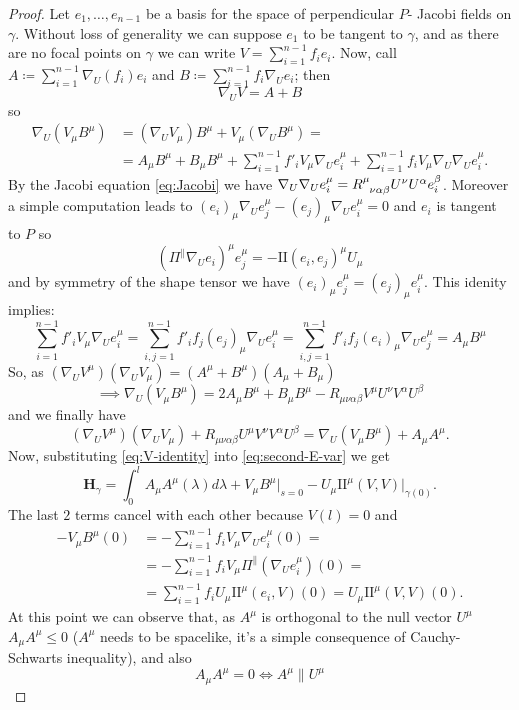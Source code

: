 \begin{proof}
	Let \(e_1, \ldots, e_{n - 1}\) be a basis for the space of perpendicular \(P\)- Jacobi fields on \(\gamma\). Without loss of generality we can suppose \(e_1\) to be tangent to \(\gamma\), and as there are no focal points on \(\gamma\) we can write \(V = \sum_{i = 1}^{n - 1} f_ie_i\).
	Now, call \(A \coloneqq \sum_{i = 1}^{n - 1} \nabla_U(f_i)e_i\) and \(B \coloneqq \sum_{i = 1}^{n - 1} f_i\nabla_Ue_i\); then
	\[
	\nabla_UV = A + B
	\]
	so
	\begin{align*}
		\nabla_U(V_{\mu}B^{\mu}) &= (\nabla_UV_{\mu})B^{\mu} + V_{\mu}(\nabla_UB^{\mu}) = \\
		 &= A_{\mu}B^{\mu} + B_{\mu}B^{\mu} + \sum_{i = 1}^{n - 1}f'_iV_{\mu}\nabla_Ue_i^{\mu} + \sum_{i = 1}^{n - 1}f_iV_{\mu}\nabla_U\nabla_Ue_i^{\mu}.
	\end{align*}
	By the Jacobi equation \eqref{eq:Jacobi} we have \(\nabla_U\nabla_Ue_i^{\mu} = R\indices{^{\mu}_{\nu\alpha\beta}}U^{\nu}U^{\alpha}e_i^{\beta}\). Moreover a simple computation leads to \((e_i)_{\mu}\nabla_Ue_j^{\mu} - (e_j)_{\mu}\nabla_Ue_i^{\mu} = 0\) and \(e_i\) is tangent to \(P\) so
	\[
	(\Pi^{\parallel}\nabla_Ue_i)^{\mu}e_j^{\mu} = - \mathrm{I\!I}(e_i, e_j)^{\mu}U_{\mu}
	\]
	and by symmetry of the shape tensor we have \((e_i)_{\mu}e_j^{\mu} = (e_j)_{\mu}e_i^{\mu}\). This idenity implies:
	\[
	\sum_{i = 1}^{n - 1}f'_iV_{\mu}\nabla_Ue_i^{\mu} = \sum_{i, j = 1}^{n - 1}f'_if_j(e_j)_{\mu}\nabla_Ue_i^{\mu} = \sum_{i, j = 1}^{n - 1}f'_if_j(e_i)_{\mu}\nabla_Ue_j^{\mu} = A_{\mu}B^{\mu}
	\]
	So, as \((\nabla_UV^{\mu})(\nabla_UV_{\mu}) = (A^{\mu} + B^{\mu}) (A_{\mu} + B_{\mu})\)
	\[
	\implies \nabla_U(V_{\mu}B^{\mu}) = 2A_{\mu}B^{\mu} + B_{\mu}B^{\mu} - R_{\mu\nu\alpha\beta}V^{\mu}U^{\nu}V^{\alpha}U^{\beta}
	\]
	and we finally have
	\begin{equation}
	\label{eq:V-identity}
		(\nabla_UV^{\mu})(\nabla_UV_{\mu}) + R_{\mu\nu\alpha\beta}U^{\mu}V^{\nu}V^{\alpha}U^{\beta} =  \nabla_U(V_{\mu}B^{\mu})  + A_{\mu}A^{\mu}.
	\end{equation}
	Now, substituting \eqref{eq:V-identity} into \eqref{eq:second-E-var} we get
	\[
	\textbf{H}_{\gamma} = \int_{0}^{l} A_{\mu}A^{\mu}(\lambda) d\lambda + V_{\mu}B^{\mu}\Big\vert_{s = 0} - U_{\mu}\mathrm{I\!I}^{\mu}(V, V)\vert_{\gamma(0)}.
	\]
	The last \(2\) terms cancel with each other because \(V(l) = 0\) and 
	\begin{align*}
		-V_{\mu}B^{\mu}(0) &= - \sum_{i = 1}^{n - 1}f_i V_{\mu}\nabla_Ue_i^{\mu}(0) =\\
		& = - \sum_{i = 1}^{n - 1}f_i V_{\mu}\Pi^{\parallel}\left(\nabla_Ue_i^{\mu}\right)(0) =\\
		& = \sum_{i = 1}^{n - 1}f_i U_{\mu}\mathrm{I\!I}^{\mu}(e_i, V)(0) = U_{\mu}\mathrm{I\!I}^{\mu}(V, V)(0).
	\end{align*}
	At this point we can observe that, as \(A^{\mu}\) is orthogonal to the null vector \(U^{\mu}\) \(A_{\mu}A^{\mu} \le 0\) (\(A^{\mu}\) needs to be spacelike, it's a simple consequence of Cauchy-Schwarts inequality), and also
	\[
	A_{\mu}A^{\mu} = 0 \iff A^{\mu}\parallel U^{\mu}
	\]
\end{proof}



